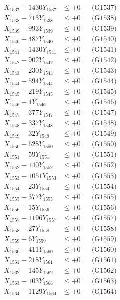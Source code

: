 \documentclass[a4paper,10pt]{article}
\begin{document}
{\begin{align}
X_{1537} - 1430Y_{1537} &\leq +0 && \text{(G1537)} \\
X_{1538} - 713Y_{1538} &\leq +0 && \text{(G1538)} \\
X_{1539} - 993Y_{1539} &\leq +0 && \text{(G1539)} \\
X_{1540} - 487Y_{1540} &\leq +0 && \text{(G1540)} \\
\allowbreak
X_{1541} - 1430Y_{1541} &\leq +0 && \text{(G1541)} \\
X_{1542} - 902Y_{1542} &\leq +0 && \text{(G1542)} \\
X_{1543} - 230Y_{1543} &\leq +0 && \text{(G1543)} \\
X_{1544} - 594Y_{1544} &\leq +0 && \text{(G1544)} \\
X_{1545} - 219Y_{1545} &\leq +0 && \text{(G1545)} \\
X_{1546} - 4Y_{1546} &\leq +0 && \text{(G1546)} \\
X_{1547} - 377Y_{1547} &\leq +0 && \text{(G1547)} \\
X_{1548} - 337Y_{1548} &\leq +0 && \text{(G1548)} \\
X_{1549} - 32Y_{1549} &\leq +0 && \text{(G1549)} \\
X_{1550} - 628Y_{1550} &\leq +0 && \text{(G1550)} \\
\allowbreak
X_{1551} - 59Y_{1551} &\leq +0 && \text{(G1551)} \\
X_{1552} - 140Y_{1552} &\leq +0 && \text{(G1552)} \\
X_{1553} - 1051Y_{1553} &\leq +0 && \text{(G1553)} \\
X_{1554} - 23Y_{1554} &\leq +0 && \text{(G1554)} \\
X_{1555} - 377Y_{1555} &\leq +0 && \text{(G1555)} \\
X_{1556} - 15Y_{1556} &\leq +0 && \text{(G1556)} \\
X_{1557} - 1196Y_{1557} &\leq +0 && \text{(G1557)} \\
X_{1558} - 27Y_{1558} &\leq +0 && \text{(G1558)} \\
X_{1559} - 6Y_{1559} &\leq +0 && \text{(G1559)} \\
X_{1560} - 411Y_{1560} &\leq +0 && \text{(G1560)} \\
\allowbreak
X_{1561} - 218Y_{1561} &\leq +0 && \text{(G1561)} \\
X_{1562} - 145Y_{1562} &\leq +0 && \text{(G1562)} \\
X_{1563} - 103Y_{1563} &\leq +0 && \text{(G1563)} \\
X_{1564} - 1129Y_{1564} &\leq +0 && \text{(G1564)} \\

\end{align}}
\end{document}
